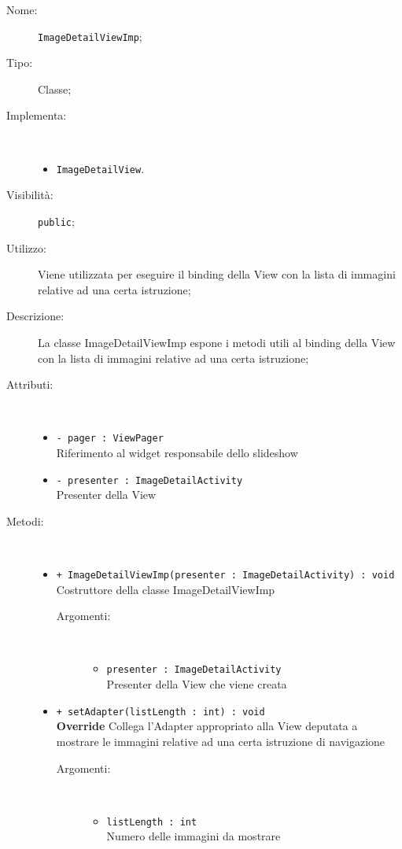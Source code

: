 \documentclass[../DefinizioneDiProdotto.tex]{subfiles}
\begin{document}
\begin{description}
	\item[Nome:] \texttt{ImageDetailViewImp};
	\item[Tipo:] Classe;
	\item[Implementa:] \
	\begin{itemize}
		\item \texttt{ImageDetailView}.
		
	\end{itemize}
	\item[Visibilità:] \texttt{public};
	\item[Utilizzo:] Viene utilizzata per eseguire il binding della View con la lista di immagini relative ad una certa istruzione;
	\item[Descrizione:] La classe ImageDetailViewImp espone i metodi utili al binding della View con la lista di immagini relative ad una certa istruzione;
	\item[Attributi:] \
	\begin{itemize}
		\item \texttt{- pager : ViewPager}\\
		Riferimento al widget responsabile dello slideshow
		
		\item \texttt{- presenter : ImageDetailActivity}\\
		Presenter della View
		
	\end{itemize}
	\item[Metodi:] \
	\begin{itemize}
		\item \texttt{+ ImageDetailViewImp(presenter : ImageDetailActivity) : void}\\
		Costruttore della classe ImageDetailViewImp
		\begin{description}
			\item[Argomenti:] \
			\begin{itemize}
				\item \texttt{presenter : ImageDetailActivity}\\
				Presenter della View che viene creata\end{itemize}
		\end{description}
		\item \texttt{+ setAdapter(listLength : int) : void}\\
		\textbf{Override} Collega l'Adapter appropriato alla View deputata a mostrare le immagini relative ad una certa istruzione di navigazione
		\begin{description}
			\item[Argomenti:] \
			\begin{itemize}
				\item \texttt{listLength : int}\\
				Numero delle immagini da mostrare\end{itemize}
		\end{description}
	\end{itemize}
\end{description}
\end{document}
